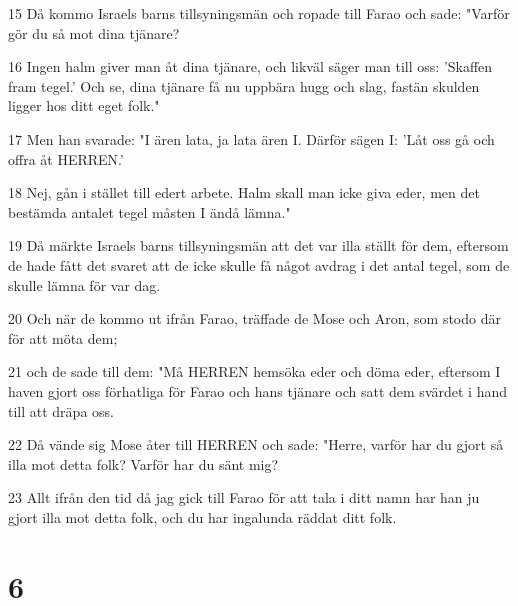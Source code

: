 \par 15 Då kommo Israels barns tillsyningsmän och ropade till Farao och sade: "Varför gör du så mot dina tjänare?
\par 16 Ingen halm giver man åt dina tjänare, och likväl säger man till oss: 'Skaffen fram tegel.' Och se, dina tjänare få nu uppbära hugg och slag, fastän skulden ligger hos ditt eget folk."
\par 17 Men han svarade: "I ären lata, ja lata ären I. Därför sägen I: 'Låt oss gå och offra åt HERREN.'
\par 18 Nej, gån i stället till edert arbete. Halm skall man icke giva eder, men det bestämda antalet tegel måsten I ändå lämna."
\par 19 Då märkte Israels barns tillsyningsmän att det var illa ställt för dem, eftersom de hade fått det svaret att de icke skulle få något avdrag i det antal tegel, som de skulle lämna för var dag.
\par 20 Och när de kommo ut ifrån Farao, träffade de Mose och Aron, som stodo där för att möta dem;
\par 21 och de sade till dem: "Må HERREN hemsöka eder och döma eder, eftersom I haven gjort oss förhatliga för Farao och hans tjänare och satt dem svärdet i hand till att dräpa oss.
\par 22 Då vände sig Mose åter till HERREN och sade: "Herre, varför har du gjort så illa mot detta folk? Varför har du sänt mig?
\par 23 Allt ifrån den tid då jag gick till Farao för att tala i ditt namn har han ju gjort illa mot detta folk, och du har ingalunda räddat ditt folk.

\chapter{6}


